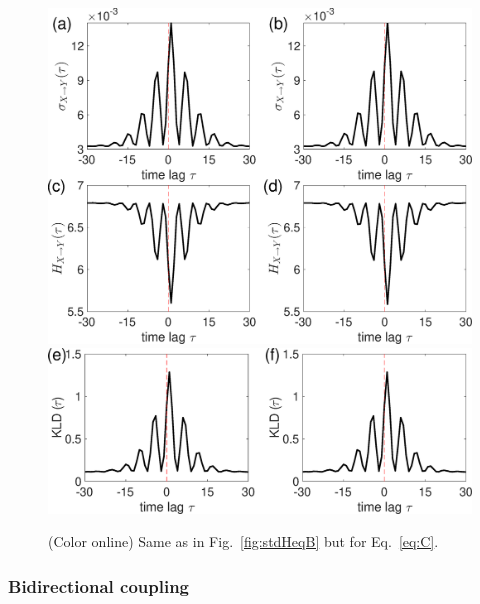 \documentclass[12pt,aip,cha,reprint,nofootinbib]{revtex4-1}
\begin{document}
\begin{figure}
	\centering
	\includegraphics[width=\columnwidth]{E_C.eps}
	\includegraphics[width=\columnwidth]{KL_C.eps}
\caption{(Color online) Same as in Fig.~\ref{fig:stdHeqB} but for Eq.~\eqref{eq:C}.  \label{fig:stdHeqC}}
\end{figure}

\subsubsection{Bidirectional coupling}
\end{document}
